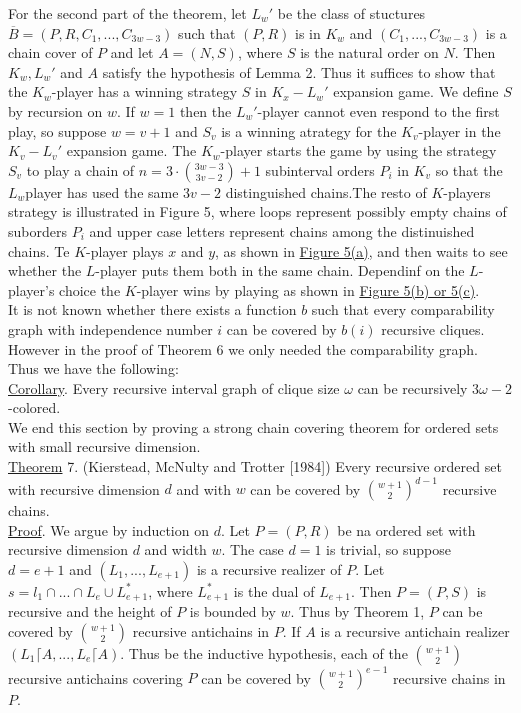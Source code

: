\documentclass[twoside]{article}
\begin{document}
For the second part of the theorem, let $L_w'$ be the class of stuctures
$\overline{B} = (P,R,C_1,...,C_{3w-3})$ such that $(P,R)$ is in $K_w$ and 
$(C_1,...,C_{3w-3})$ is a chain cover of $P$ and let $A=(N,S)$, where $S$ 
is the natural order on $N$. Then $K_w,L_w'$ and $A$ satisfy the
hypothesis of Lemma 2. Thus it suffices to show that the $K_w$-player has
a winning strategy $S$ in $K_x-L_w'$ expansion game.
%
%
We define $S$ by recursion on $w$. If $w=1$ then the $L_w'$-player cannot
even respond to the first play, so suppose $w=v+1$ and $S_v$ is a winning atrategy
for the $K_v$-player in the $K_v-L_v'$ expansion game. The $K_w$-player starts
the game by using the strategy $S_v$ to play a chain of 
$n = 3 \cdot {{3w-3} \choose {3v-2}} +1$ subinterval orders $P_i$ in $K_v$ so that
the $L_w$player has used the same $3v-2$ distinguished chains.The resto of $K$-players
strategy is illustrated in  Figure 5, where loops represent possibly empty chains of
suborders $P_i$ and upper case letters represent chains among the distinuished chains.
Te $K$-player plays $x$ and $y$, as shown in \underline{Figure 5(a)}, and then waits
to see whether the $L$-player puts them both in the same chain. Dependinf on the 
$L$-player's choice the $K$-player wins by playing as shown in
\underline{Figure 5(b) or 5(c)}.\\

It is not known whether there exists a function $b$ such that every comparability
graph with independence number $i$ can be covered by $b(i)$ recursive cliques.
However in the proof of Theorem 6 we only needed the comparability graph.
Thus we have the following:\\
\newline
\underline{Corollary}. Every recursive interval graph of clique size $\omega$ can
be recursively $3\omega -2$-colored.\\
\newline
We end this section by proving a strong chain covering theorem for ordered sets with small 
recursive dimension.\\
\newline
\underline{Theorem} 7. (Kierstead, McNulty and Trotter [1984]) Every recursive
ordered set with recursive dimension $d$ and with $w$ can be covered by 
${{w+1} \choose 2}^{d-1}$ recursive chains.\\
\newline
\underline{Proof}. We argue by induction on $d$. Let $P = (P,R)$ be na ordered set 
with recursive dimension $d$ and width $w$. The case $d=1$ is trivial, so suppose
$d=e+1$ and $(L_1,...,L_{e+1})$ is a recursive realizer of $P$. Let
$s=l_1 \cap ... \cap L_e\cup L_{e+1}^*$, where $L_{e+1}^*$ is the dual of $L_{e+1}$.
Then $P=(P,S)$ is recursive and the height of $P$ is bounded by $w$. Thus by Theorem 1, $P$
can be covered by ${w+1} \choose 2$ recursive antichains in $P$. If $A$ is a recursive antichain
realizer $(L_1 \lceil A,...,L_e \lceil A)$. Thus be the inductive hypothesis, each of the 
${w+1 \choose 2}$ recursive antichains covering $P$ can be covered by ${{w+1} \choose 2}^{e-1}$
recursive chains in $P$.\\
\end{document}
